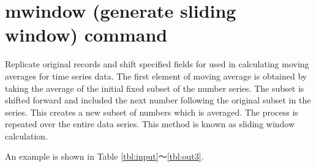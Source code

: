\documentclass[a4paper]{jarticle}
\begin{document}
\setlength{\baselineskip}{4mm}

\section*{mwindow (generate sliding window) command}
Replicate original records and shift specified fields for used in calculating moving averages for time series data. The first element of moving average is obtained by taking the average of the initial fixed subset of the number series. The subset is shifted forward and included the next number following the original subset in the series. This creates a new subset of numbers which is averaged. The process is repeated over the entire data series. This method is known as sliding window calculation. 

An example is shown in Table \ref{tbl:input}〜\ref{tbl:out3}.

\renewcommand{\tablename}{Table.}
\end{document}
